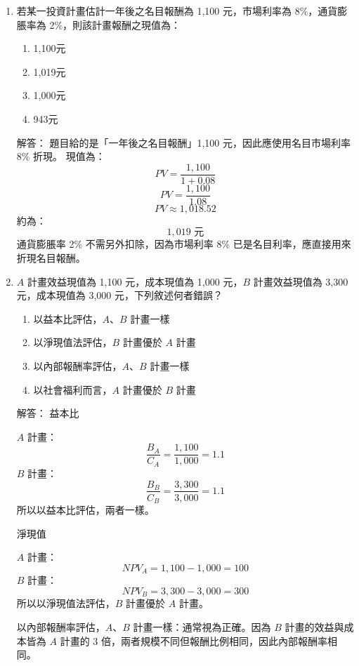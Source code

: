\documentclass[12pt, a4paper]{article}
\begin{document}
\begin{enumerate}
    \item 若某一投資計畫估計一年後之名目報酬為 1,100 元，市場利率為 8\%，通貨膨脹率為 2\%，則該計畫報酬之現值為：
    \begin{enumerate}[label=\Alph*.]
        \item 1,100元
        \item 1,019元
        \item 1,000元
        \item 943元
    \end{enumerate}
    解答：
    題目給的是「一年後之名目報酬」1,100 元，因此應使用名目市場利率 8\% 折現。
    現值為：
    \[
    PV = \frac{1,100}{1+0.08}
    \]
    \[
    PV = \frac{1,100}{1.08}
    \]
    \[
    PV \approx 1,018.52
    \]
    約為：
    \[
    \boxed{1,019\text{ 元}}
    \]
    通貨膨脹率 2\% 不需另外扣除，因為市場利率 8\% 已是名目利率，應直接用來折現名目報酬。

    \item \(A\) 計畫效益現值為 1,100 元，成本現值為 1,000 元，\(B\) 計畫效益現值為 3,300 元，成本現值為 3,000 元，下列敘述何者錯誤？
    \begin{enumerate}[label=\Alph*.]
        \item 以益本比評估，\(A\)、\(B\) 計畫一樣
        \item 以淨現值法評估，\(B\) 計畫優於 \(A\) 計畫
        \item 以內部報酬率評估，\(A\)、\(B\) 計畫一樣
        \item 以社會福利而言，\(A\) 計畫優於 \(B\) 計畫
    \end{enumerate}
    解答：
    益本比

    \(A\) 計畫：
    \[
    \frac{B_A}{C_A}=\frac{1,100}{1,000}=1.1
    \]
    \(B\) 計畫：
    \[
    \frac{B_B}{C_B}=\frac{3,300}{3,000}=1.1
    \]
    所以以益本比評估，兩者一樣。

    淨現值

    \(A\) 計畫：
    \[
    NPV_A = 1,100 - 1,000 = 100
    \]
    \(B\) 計畫：
    \[
    NPV_B = 3,300 - 3,000 = 300
    \]
    所以以淨現值法評估，\(B\) 計畫優於 \(A\) 計畫。

    以內部報酬率評估，\(A\)、\(B\) 計畫一樣：通常視為正確。因為 \(B\) 計畫的效益與成本皆為 \(A\) 計畫的 3 倍，兩者規模不同但報酬比例相同，因此內部報酬率相同。


\end{enumerate}
\end{document}

